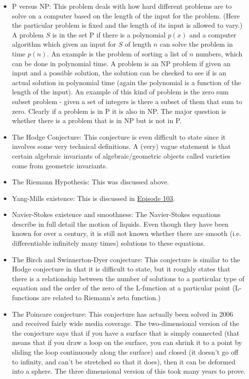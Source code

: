 \begin{itemize}

\item P versus NP: This problem deals with how hard different problems are to solve on a computer based on the length of the input for the problem. (Here the particular problem is fixed and the length of its input is allowed to vary.) A problem $S$ is in the set P if there is a polynomial $p(x)$ and a computer algorithm which given an input for $S$ of length $n$ can solve the problem in time $p(n)$. An example is the problem of sorting a list of $n$ numbers, which can be done in polynomial time. A problem is an NP problem if given an input and a possible solution, the solution can be checked to see if is an actual solution in polynomial time (again the polynomial is a function of the length of the input). An example of this kind of problem is the zero sum subset problem - given a set of integers is there a subset of them that sum to zero. Clearly if a problem is in P it is also in NP. The major question is whether there is a problem that is in NP but is not in P.
\item The Hodge Conjecture: This conjecture is even difficult to state since it involves some very technical definitions. A (very) vague statement is that certain algebraic invariants of algebraic/geometric objects called varieties come from geometric invariants.

\item The Riemann Hypothesis: This was discussed above.

\item Yang-Mills existence: This is discussed in \hyperref[103]{Episode 103}.

\item Navier-Stokes existence and smoothness: The Navier-Stokes equations describe in full detail the motion of liquids. Even though they have been known for over a century, it is still not known whether there are smooth (i.e. differentiable infinitely many times) solutions to these equations.

\item The Birch and Swinnerton-Dyer conjecture: This conjecture is similar to the Hodge conjecture in that it is difficult to state, but it roughly states that there is a relationship between the number of solutions to a particular type of equation and the order of the zero of the L-function at a particular point (L-functions are related to Riemann's zeta function.)

\item The Poincare conjecture: This conjecture has actually been solved in 2006 and received fairly wide media coverage. The two-dimensional version of the the conjecture says that if you have a surface that is simply connected (that means that if you draw a loop on the surface, you can shrink it to a point by sliding the loop continuously along the surface) and closed (it doesn't go off to infinity, and can't be stretched so that it does), then it can be deformed into a sphere. The three dimensional version of this took many years to prove.
\end{itemize}

